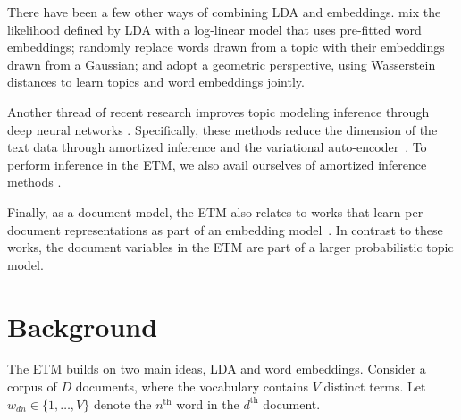 \documentclass[11pt,a4paper]{article}
\begin{document}
There have been a few other ways of combining \gls{LDA} and
embeddings. \citet{nguyen2015improving} mix the likelihood defined by
\gls{LDA} with a log-linear model that uses pre-fitted word
embeddings; \citet{bunk2018welda} randomly replace words drawn from a
topic with their embeddings drawn from a Gaussian; and
\citet{xu2018distilled} adopt a geometric perspective, using
Wasserstein distances to learn topics and word embeddings jointly.

Another thread of recent research improves topic modeling inference
through deep neural networks \citep{srivastava2017autoencoding,
  card2017neural,cong2017deep, zhang2018whai}. Specifically, these
methods reduce the dimension of the text data through amortized
inference and the variational
auto-encoder~\citep{kingma2014autoencoding, rezende2014stochastic}.
To perform inference in the \gls{ETM}, we also avail ourselves of
amortized inference methods \citep{Gershman2014}.

Finally, as a document model, the \gls{ETM} also relates to works that
learn per-document representations as part of an embedding
model~\citep{Le2014, moody2016mixing, miao2016neural}. In contrast to
these works, the document variables in the \gls{ETM} are part of a larger
probabilistic topic model.




 \section{Background}
\label{sec:background}

The \acrshort{ETM} builds on two main ideas, \gls{LDA} and word
embeddings. Consider a corpus of $D$ documents, where the vocabulary
contains $V$ distinct terms. Let $w_{dn}\in\{1,\ldots,V \}$ denote the
$n^{\textrm{th}}$ word in the $d^{\textrm{th}}$ document.
\end{document}
